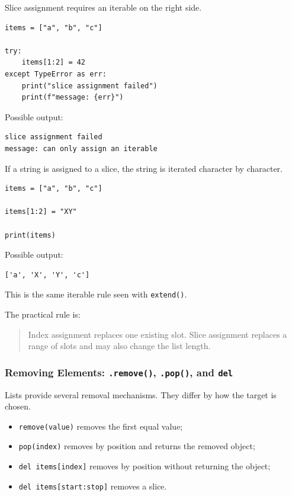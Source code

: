 Slice assignment requires an iterable on the right side.

\begin{verbatim}
items = ["a", "b", "c"]

try:
    items[1:2] = 42
except TypeError as err:
    print("slice assignment failed")
    print(f"message: {err}")
\end{verbatim}

Possible output:

\begin{verbatim}
slice assignment failed
message: can only assign an iterable
\end{verbatim}

If a string is assigned to a slice, the string is iterated character by character.

\begin{verbatim}
items = ["a", "b", "c"]

items[1:2] = "XY"

print(items)
\end{verbatim}

Possible output:

\begin{verbatim}
['a', 'X', 'Y', 'c']
\end{verbatim}

This is the same iterable rule seen with \texttt{extend()}.

The practical rule is:

\begin{quote}
Index assignment replaces one existing slot. Slice assignment replaces a range of slots and may also change the list length.
\end{quote}

\subsubsection{Removing Elements: \texttt{.remove()}, \texttt{.pop()}, and \texttt{del}}

Lists provide several removal mechanisms. They differ by how the target is chosen.

\begin{itemize}
    \item \texttt{remove(value)} removes the first equal value;
    \item \texttt{pop(index)} removes by position and returns the removed object;
    \item \texttt{del items[index]} removes by position without returning the object;
    \item \texttt{del items[start:stop]} removes a slice.
\end{itemize}

